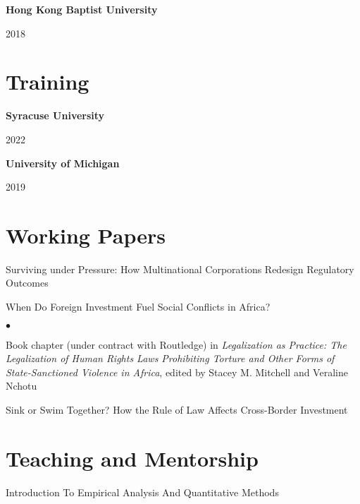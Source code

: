 \documentclass[margin,line]{res}
\newenvironment{list2}{
  \begin{list}{$\bullet$}{%
      \setlength{\itemsep}{0in}
      \setlength{\parsep}{0in} \setlength{\parskip}{0in}
      \setlength{\topsep}{0in} \setlength{\partopsep}{0in} 
      \setlength{\leftmargin}{0.43in}}}{\end{list}}
\begin{document}
\begin{resume}
{\bf Hong Kong Baptist University}

\vspace{-.33cm}
 \hfill{2018}\\
\vspace*{-.13in}  

\section{\sc Training}
{\bf Syracuse University}

\vspace{-.33cm}
\hspace{1.5em}{The Institute for Qualitative and Multi-Method Research (IQMR)} \hfill{2022}

{\bf University of Michigan}

\vspace{-.33cm}
\hspace{1.5em}{Inter-university Consortium for Political and Social Research (ICPSR)} \hfill{2019}

\section{\sc Working Papers}
Surviving under Pressure: How Multinational Corporations Redesign Regulatory Outcomes

When Do Foreign Investment Fuel Social Conflicts in Africa?
\vspace*{.05in}
\begin{list2}
\item Book chapter (under contract with Routledge) in \emph {Legalization as Practice: The Legalization of Human Rights Laws Prohibiting Torture and Other Forms of State-Sanctioned Violence in Africa}, edited by Stacey M. Mitchell and Veraline Nchotu
\end{list2}

Sink or Swim Together? How the Rule of Law Affects Cross-Border Investment
\vspace*{.05in}

\section{\sc Teaching and Mentorship}
{Introduction To Empirical Analysis And Quantitative Methods} 


\end{resume}
\end{document}
